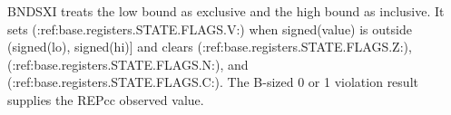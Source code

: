 BNDSXI treats the low bound as exclusive and the high bound as inclusive. It sets (:ref:base.registers.STATE.FLAGS.V:) when signed(value) is outside (signed(lo), signed(hi)] and clears (:ref:base.registers.STATE.FLAGS.Z:), (:ref:base.registers.STATE.FLAGS.N:), and (:ref:base.registers.STATE.FLAGS.C:). The B-sized 0 or 1 violation result supplies the REPcc observed value.
